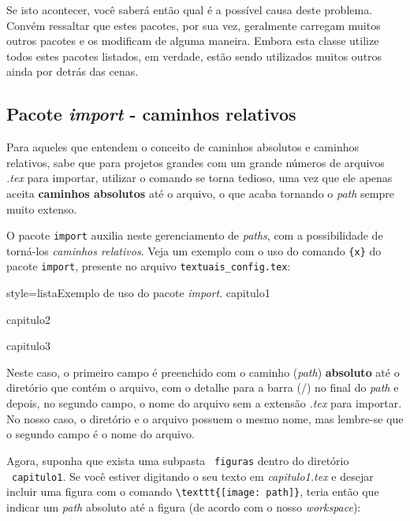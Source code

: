 \noindent
Se isto acontecer, você saberá então qual é a possível causa deste problema. Convém ressaltar que estes pacotes, por sua vez, geralmente carregam muitos outros pacotes e os modificam de alguma maneira. Embora esta classe utilize todos estes pacotes listados, em verdade, estão sendo utilizados muitos outros ainda por detrás das cenas.

\subsection{Pacote \textit{import} - caminhos relativos}

Para aqueles que entendem o conceito de caminhos absolutos e caminhos relativos, sabe que para projetos grandes com um grande números de arquivos \emph{.tex} para importar, utilizar o comando \Verb++ se torna tedioso, uma vez que ele apenas aceita \textbf{caminhos absolutos} até o arquivo, o que acaba tornando o \emph{path} sempre muito extenso. 

O pacote \texttt{import} auxilia neste gerenciamento de \emph{paths}, com a possibilidade de torná-los \emph{caminhos relativos}. Veja um exemplo com o uso do comando \Verb+{x}+ do pacote \texttt{import}, presente no arquivo \texttt{textuais\_config.tex}:

\begin{codigo}{style=lista}{Exemplo de uso do pacote \emph{import}.}
{capitulo1}

{capitulo2}

{capitulo3}
\end{codigo}

Neste caso, o primeiro campo é preenchido com o caminho (\emph{path}) \textbf{absoluto} até o diretório que contém o arquivo, com o detalhe para a barra (/) no final do \emph{path} e depois, no segundo campo, o nome do arquivo sem a extensão \emph{.tex} para importar. No nosso caso, o diretório e o arquivo possuem o mesmo nome, mas lembre-se que o segundo campo é o nome do arquivo.

Agora, suponha que exista uma subpasta \drawtikzfolder\ \texttt{figuras} dentro do diretório \mbox{\drawtikzfolder\ \texttt{capitulo1}}. Se você estiver digitando o seu texto em \emph{capitulo1.tex} e desejar incluir uma figura com o comando \Verb+\texttt{[image: path]}+, teria então que indicar um \emph{path} absoluto até a figura (de acordo com o nosso \emph{workspace}):

